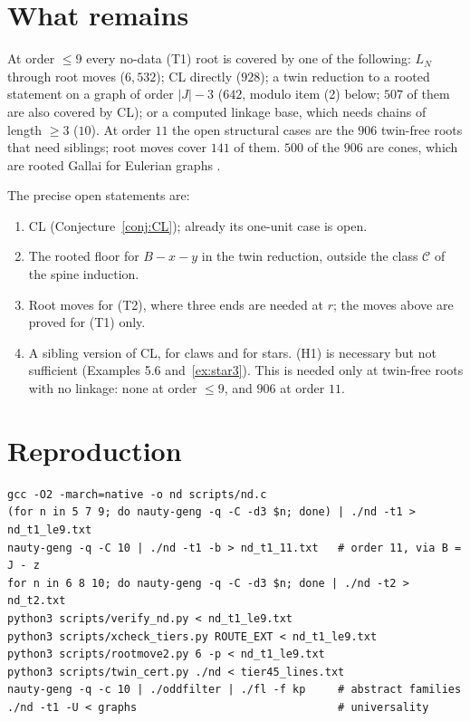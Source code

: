 \documentclass[11pt]{amsart}
\theoremstyle{definition}
\theoremstyle{remark}
\renewcommand{\_}{\oldunderscore\allowbreak}
\begin{document}
\section{What remains}\label{sec:remains}

At order $\le9$ every no-data (T1) root is covered by one of the following: $L_N$ through root
moves ($6{,}532$); CL directly ($928$); a twin reduction to a rooted statement on a graph of order
$|J|-3$ ($642$, modulo item (2) below; $507$ of them are also covered by CL); or a computed linkage
base, which needs chains of length $\ge3$ ($10$). At order $11$ the open structural cases are the $906$ twin-free roots
that need siblings; root moves cover $141$ of them. $500$ of the $906$ are cones, which are rooted
Gallai for Eulerian graphs \cite{EC}.

The precise open statements are:
\begin{enumerate}[label=(\arabic*)]
\item CL (Conjecture~\ref{conj:CL}); already its one-unit case is open.
\item The rooted floor for $B-x-y$ in the twin reduction, outside the class $\mathcal C$ of the
spine induction.
\item Root moves for (T2), where three ends are needed at $r$; the moves above are proved for (T1)
only.
\item A sibling version of CL, for claws and for stars. (H1) is necessary but not sufficient
(Examples 5.6 and~\ref{ex:star3}).
This is needed only at twin-free roots with no linkage: none at order $\le9$, and $906$ at order
$11$.
\end{enumerate}

\section{Reproduction}
\begin{verbatim}
gcc -O2 -march=native -o nd scripts/nd.c
(for n in 5 7 9; do nauty-geng -q -C -d3 $n; done) | ./nd -t1 > nd_t1_le9.txt
nauty-geng -q -C 10 | ./nd -t1 -b > nd_t1_11.txt   # order 11, via B = J - z
for n in 6 8 10; do nauty-geng -q -C -d3 $n; done | ./nd -t2 > nd_t2.txt
python3 scripts/verify_nd.py < nd_t1_le9.txt
python3 scripts/xcheck_tiers.py ROUTE_EXT < nd_t1_le9.txt
python3 scripts/rootmove2.py 6 -p < nd_t1_le9.txt
python3 scripts/twin_cert.py ./nd < tier45_lines.txt
nauty-geng -q -c 10 | ./oddfilter | ./fl -f kp     # abstract families
./nd -t1 -U < graphs                               # universality
\end{verbatim}
\end{document}
